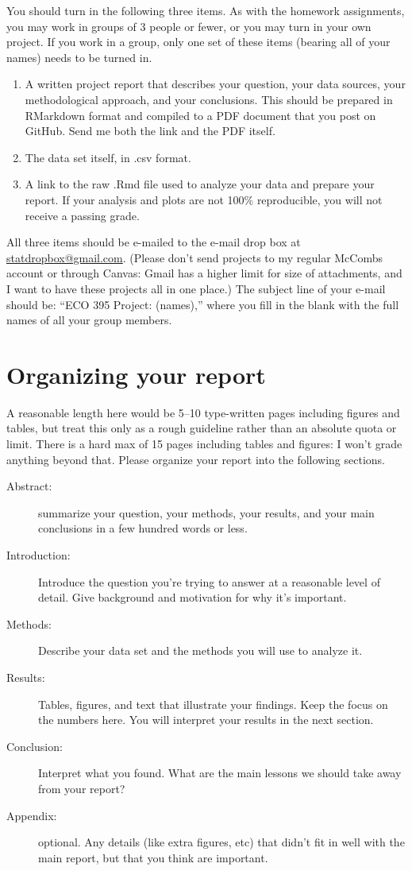 \documentclass{mynotes}
\begin{document}
You should turn in the following three items.  As with the homework assignments, you may work in groups of 3 people or fewer, or you may turn in your own project.  If you work in a group, only one set of these items (bearing all of your names) needs to be turned in.
\begin{enumerate}
\item A written project report that describes your question, your data sources, your methodological approach, and your conclusions.  This should be prepared in RMarkdown format and compiled to a PDF document that you post on GitHub.  Send me both the link and the PDF itself.    
\item The data set itself, in .csv format.
\item A link to the raw .Rmd file used to analyze your data and prepare your report.  If your analysis and plots are not 100$\%$ reproducible, you will not receive a passing grade.
\end{enumerate}
All three items should be e-mailed to the e-mail drop box at \url{statdropbox@gmail.com}.  (Please don't send projects to my regular McCombs account or through Canvas: Gmail has a higher limit for size of attachments, and I want to have these projects all in one place.)  The subject line of your e-mail should be: ``ECO 395 Project: (names),'' where you fill in the blank with the full names of all your group members.


\section{Organizing your report}

A reasonable length here would be 5--10 type-written pages including figures and tables, but treat this only as a rough guideline rather than an absolute quota or limit.  There is a hard max of 15 pages including tables and figures: I won't grade anything beyond that.  Please organize your report into the following sections.
\begin{description}
\item[Abstract:] summarize your question, your methods, your results, and your main conclusions in a few hundred words or less.
\item[Introduction:] Introduce the question you're trying to answer at a reasonable level of detail.  Give background and motivation for why it's important.
\item[Methods:] Describe your data set and the methods you will use to analyze it.
\item[Results:] Tables, figures, and text that illustrate your findings.  Keep the focus on the numbers here.  You will interpret your results in the next section.
\item[Conclusion:] Interpret what you found. What are the main lessons we should take away from your report?
\item[Appendix:] optional.  Any details (like extra figures, etc) that didn't fit in well with the main report, but that you think are important.
\end{description}
\end{document}
